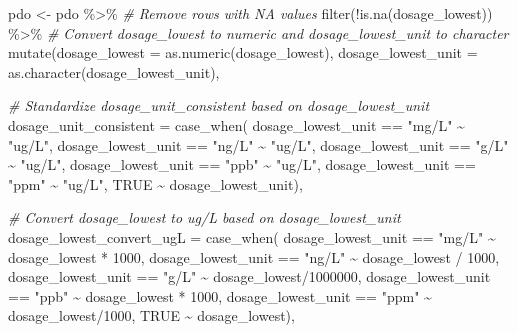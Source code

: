 \documentclass[
]{article}
\newenvironment{Shaded}{\begin{snugshade}}{\end{snugshade}}
\newcommand{\AttributeTok}[1]{\textcolor[rgb]{0.77,0.63,0.00}{#1}}
\newcommand{\CommentTok}[1]{\textcolor[rgb]{0.56,0.35,0.01}{\textit{#1}}}
\newcommand{\ConstantTok}[1]{\textcolor[rgb]{0.00,0.00,0.00}{#1}}
\newcommand{\DecValTok}[1]{\textcolor[rgb]{0.00,0.00,0.81}{#1}}
\newcommand{\FunctionTok}[1]{\textcolor[rgb]{0.00,0.00,0.00}{#1}}
\newcommand{\NormalTok}[1]{#1}
\newcommand{\OtherTok}[1]{\textcolor[rgb]{0.56,0.35,0.01}{#1}}
\newcommand{\SpecialCharTok}[1]{\textcolor[rgb]{0.00,0.00,0.00}{#1}}
\newcommand{\StringTok}[1]{\textcolor[rgb]{0.31,0.60,0.02}{#1}}
\begin{document}
\begin{Shaded}
\begin{Highlighting}[]
\NormalTok{pdo }\OtherTok{\textless{}{-}}\NormalTok{ pdo }\SpecialCharTok{\%\textgreater{}\%}
  \CommentTok{\# Remove rows with NA values}
  \FunctionTok{filter}\NormalTok{(}\SpecialCharTok{!}\FunctionTok{is.na}\NormalTok{(dosage\_lowest)) }\SpecialCharTok{\%\textgreater{}\%}
  \CommentTok{\# Convert dosage\_lowest to numeric and dosage\_lowest\_unit to character}
  \FunctionTok{mutate}\NormalTok{(}\AttributeTok{dosage\_lowest =} \FunctionTok{as.numeric}\NormalTok{(dosage\_lowest),}
         \AttributeTok{dosage\_lowest\_unit =} \FunctionTok{as.character}\NormalTok{(dosage\_lowest\_unit),}
         
         \CommentTok{\# Standardize dosage\_unit\_consistent based on dosage\_lowest\_unit}
         \AttributeTok{dosage\_unit\_consistent =} \FunctionTok{case\_when}\NormalTok{(}
\NormalTok{           dosage\_lowest\_unit }\SpecialCharTok{==} \StringTok{"mg/L"} \SpecialCharTok{\textasciitilde{}} \StringTok{"ug/L"}\NormalTok{,}
\NormalTok{           dosage\_lowest\_unit }\SpecialCharTok{==} \StringTok{"ng/L"} \SpecialCharTok{\textasciitilde{}} \StringTok{"ug/L"}\NormalTok{,}
\NormalTok{           dosage\_lowest\_unit }\SpecialCharTok{==} \StringTok{"g/L"} \SpecialCharTok{\textasciitilde{}} \StringTok{"ug/L"}\NormalTok{,}
\NormalTok{           dosage\_lowest\_unit }\SpecialCharTok{==} \StringTok{"ppb"} \SpecialCharTok{\textasciitilde{}} \StringTok{"ug/L"}\NormalTok{,}
\NormalTok{           dosage\_lowest\_unit }\SpecialCharTok{==} \StringTok{"ppm"} \SpecialCharTok{\textasciitilde{}} \StringTok{"ug/L"}\NormalTok{,}
           \ConstantTok{TRUE} \SpecialCharTok{\textasciitilde{}}\NormalTok{ dosage\_lowest\_unit),}
         
         \CommentTok{\# Convert dosage\_lowest to ug/L based on dosage\_lowest\_unit}
         \AttributeTok{dosage\_lowest\_convert\_ugL =} \FunctionTok{case\_when}\NormalTok{(}
\NormalTok{           dosage\_lowest\_unit }\SpecialCharTok{==} \StringTok{"mg/L"} \SpecialCharTok{\textasciitilde{}}\NormalTok{ dosage\_lowest }\SpecialCharTok{*} \DecValTok{1000}\NormalTok{,}
\NormalTok{           dosage\_lowest\_unit }\SpecialCharTok{==} \StringTok{"ng/L"} \SpecialCharTok{\textasciitilde{}}\NormalTok{ dosage\_lowest }\SpecialCharTok{/} \DecValTok{1000}\NormalTok{,}
\NormalTok{           dosage\_lowest\_unit }\SpecialCharTok{==} \StringTok{"g/L"} \SpecialCharTok{\textasciitilde{}}\NormalTok{ dosage\_lowest}\SpecialCharTok{/}\DecValTok{1000000}\NormalTok{,}
\NormalTok{           dosage\_lowest\_unit }\SpecialCharTok{==} \StringTok{"ppb"} \SpecialCharTok{\textasciitilde{}}\NormalTok{ dosage\_lowest }\SpecialCharTok{*} \DecValTok{1000}\NormalTok{,}
\NormalTok{           dosage\_lowest\_unit }\SpecialCharTok{==} \StringTok{"ppm"} \SpecialCharTok{\textasciitilde{}}\NormalTok{ dosage\_lowest}\SpecialCharTok{/}\DecValTok{1000}\NormalTok{,}
           \ConstantTok{TRUE} \SpecialCharTok{\textasciitilde{}}\NormalTok{ dosage\_lowest),}
         

\end{Highlighting}
\end{Shaded}
\end{document}

